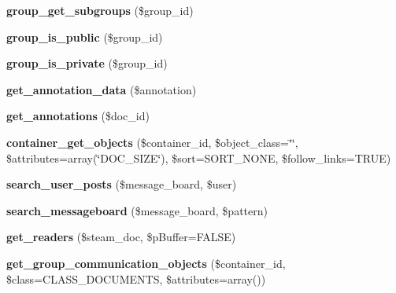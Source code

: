 \begin{DoxyCompactItemize}
\item 
\hypertarget{classlms__steam_ab31353ca5a34d5b3a6fd4fcef858f90c}{
{\bfseries group\_\-get\_\-subgroups} (\$group\_\-id)}
\label{classlms__steam_ab31353ca5a34d5b3a6fd4fcef858f90c}

\item 
\hypertarget{classlms__steam_ab9a6c964d1cc75b0eca2ecc3ad28d776}{
{\bfseries group\_\-is\_\-public} (\$group\_\-id)}
\label{classlms__steam_ab9a6c964d1cc75b0eca2ecc3ad28d776}

\item 
\hypertarget{classlms__steam_a425e8757260adfee7c56d7c189cf3a16}{
{\bfseries group\_\-is\_\-private} (\$group\_\-id)}
\label{classlms__steam_a425e8757260adfee7c56d7c189cf3a16}

\item 
\hypertarget{classlms__steam_a9dc695ba8f05d96d1cae33080e98c213}{
{\bfseries get\_\-annotation\_\-data} (\$annotation)}
\label{classlms__steam_a9dc695ba8f05d96d1cae33080e98c213}

\item 
\hypertarget{classlms__steam_a5f5a86cce96cac58a5f1412ed346beab}{
{\bfseries get\_\-annotations} (\$doc\_\-id)}
\label{classlms__steam_a5f5a86cce96cac58a5f1412ed346beab}

\item 
\hypertarget{classlms__steam_af80c979a484974cbd2b95b13e4c9f7c5}{
{\bfseries container\_\-get\_\-objects} (\$container\_\-id, \$object\_\-class=\char`\"{}\char`\"{}, \$attributes=array(\char`\"{}DOC\_\-SIZE\char`\"{}), \$sort=SORT\_\-NONE, \$follow\_\-links=TRUE)}
\label{classlms__steam_af80c979a484974cbd2b95b13e4c9f7c5}

\item 
\hypertarget{classlms__steam_a80a9f6a3affccd0b7ddde7f27d36b68d}{
{\bfseries search\_\-user\_\-posts} (\$message\_\-board, \$user)}
\label{classlms__steam_a80a9f6a3affccd0b7ddde7f27d36b68d}

\item 
\hypertarget{classlms__steam_ac60972f15784fcc18d714bf2440390bd}{
{\bfseries search\_\-messageboard} (\$message\_\-board, \$pattern)}
\label{classlms__steam_ac60972f15784fcc18d714bf2440390bd}

\item 
\hypertarget{classlms__steam_aae455dc6e9540ab1197548cf02844590}{
{\bfseries get\_\-readers} (\$steam\_\-doc, \$pBuffer=FALSE)}
\label{classlms__steam_aae455dc6e9540ab1197548cf02844590}

\item 
\hypertarget{classlms__steam_abac27bf3de8c8b0e45ddc826f546cb50}{
{\bfseries get\_\-group\_\-communication\_\-objects} (\$container\_\-id, \$class=CLASS\_\-DOCUMENTS, \$attributes=array())}
\label{classlms__steam_abac27bf3de8c8b0e45ddc826f546cb50}


\end{DoxyCompactItemize}
